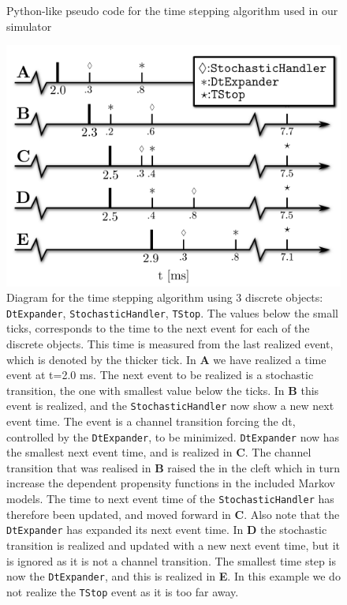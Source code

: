 \label{sec:solution}
\begin{figure}
  \centering
  \vspace{-1.5em}
  \caption{Python-like pseudo code for the time stepping algorithm used in our simulator}
  \label{fig:time-stepping-algorithm}
\end{figure}

\begin{figure}
  \centering
  \includegraphics[width=0.6\linewidth]{chapters/hake/pdf/timeline}
  \caption{Diagram for the time stepping algorithm using 3 discrete objects: \texttt{DtExpander}, \texttt{StochasticHandler}, \texttt{TStop}. The values below the small ticks, corresponds to the time to the next event for each of the discrete objects. This time is measured from the last realized event, which is denoted by the thicker tick. In \textbf{A} we have realized a time event at t=2.0 ms. The next event to be realized is a stochastic transition, the one with smallest value below the ticks. In \textbf{B} this event is realized, and the \texttt{StochasticHandler} now show a new next event time. The event is a channel transition forcing the dt, controlled by the \texttt{DtExpander}, to be minimized. \texttt{DtExpander} now has the smallest next event time, and is realized in \textbf{C}. The channel transition that was realised in \textbf{B} raised the \CaC in the cleft which in turn increase the \Ca dependent propensity functions in the included Markov models. The time to next event time of the \texttt{StochasticHandler} has therefore been updated, and moved forward in \textbf{C}. Also note that the \texttt{DtExpander} has expanded its next event time. In \textbf{D} the stochastic transition is realized and updated with a new next event time, but it is ignored as it is not a channel transition. The smallest time step is now the \texttt{DtExpander}, and this is realized in \textbf{E}. In this example we do not realize the \texttt{TStop} event as it is too far away.}
  \label{fig:time-line}
\end{figure}

